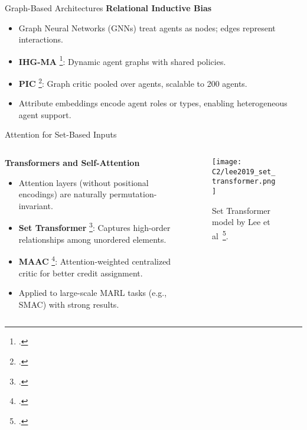 \begin{frame}{Graph-Based Architectures}
    \textbf{Relational Inductive Bias}
    \begin{itemize}
        \item Graph Neural Networks (GNNs) treat agents as nodes; edges represent interactions.
        \item \textbf{IHG-MA} \footcite{yang2021a}: Dynamic agent graphs with shared policies.
        \item \textbf{PIC} \footcite{liu2020b}: Graph critic pooled over agents, scalable to 200 agents.
        \item Attribute embeddings encode agent roles or types, enabling heterogeneous agent support.
    \end{itemize}
\end{frame}

\begin{frame}{Attention for Set-Based Inputs}
    \begin{columns}
        \begin{column}{0.6\textwidth}
            \textbf{Transformers and Self-Attention}
            \begin{itemize}
                \item Attention layers (without positional encodings) are naturally permutation-invariant.
                \item \textbf{Set Transformer} \footcite{lee2019}: 
                    Captures high-order relationships among unordered elements.
                \item \textbf{MAAC} \footcite{iqbal2019}: 
                    Attention-weighted centralized critic for better credit assignment.
                \item Applied to large-scale MARL tasks (e.g., SMAC) with strong results.
            \end{itemize}
        \end{column}
        \begin{column}{0.4\textwidth}
            \begin{figure}
                \texttt{[image: C2/lee2019\_set\_transformer.png]}
                \caption{Set Transformer model by Lee et al~\footcite{lee2019}.}
            \end{figure}
        \end{column}
    \end{columns}
\end{frame}

